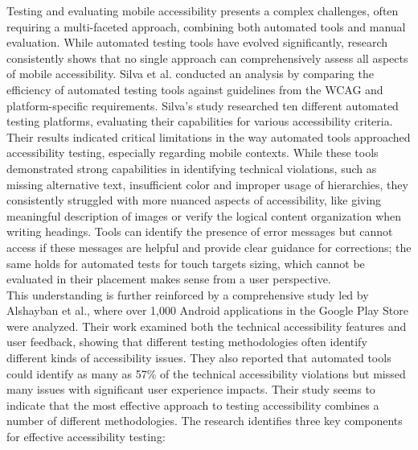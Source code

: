 Testing and evaluating mobile accessibility presents a complex challenges, often requiring a multi-faceted approach, combining both automated tools and manual evaluation. While automated testing tools have evolved significantly, research consistently shows that no single approach can comprehensively assess all aspects of mobile accessibility.
Silva et al. \cite{silva2018survey} conducted an analysis by comparing the efficiency of automated testing tools against guidelines from the WCAG and platform-specific requirements. Silva's study researched ten different automated testing platforms, evaluating their capabilities for various accessibility criteria. Their results indicated critical limitations in the way automated tools approached accessibility testing, especially regarding mobile contexts. 
While these tools demonstrated strong capabilities in identifying technical violations, such as missing alternative text, insufficient color and improper usage of hierarchies, they consistently struggled with more nuanced aspects of accessibility, like giving meaningful description of images or verify the logical content organization when writing headings. Tools can identify the presence of error messages but cannot access if these messages are helpful and provide clear guidance for corrections; the same holds for automated tests for touch targets sizing, which cannot be evaluated in their placement makes sense from a user perspective. \\

This understanding is further reinforced by a comprehensive study led by Alshayban et al., \cite{alshayban2020accessibility} where over 1,000 Android applications in the Google Play Store were analyzed. Their work examined both the technical accessibility features and user feedback, showing that different testing methodologies often identify different kinds of accessibility issues. They also reported that automated tools could identify as many as 57\% of the technical accessibility violations but missed many issues with significant user experience impacts. Their study seems to indicate that the most effective approach to testing accessibility combines a number of different methodologies. The research identifies three key components for effective accessibility testing:

